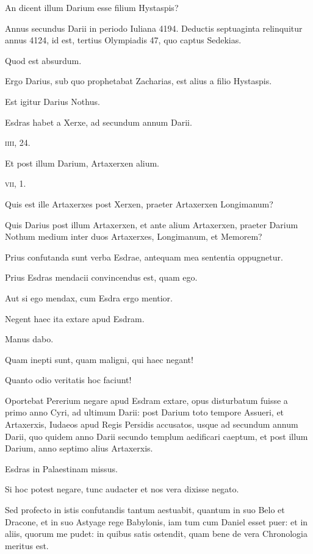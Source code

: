 \begin{parnumbers}
An dicent illum Darium esse filium Hystaspis?

Annus secundus Darii in periodo Iuliana 4194. Deductis septuaginta
relinquitur annus 4124, id est, tertius Olympiadis 47,
quo captus Sedekias.

Quod est absurdum.

Ergo Darius, sub quo
prophetabat Zacharias, est alius a filio Hystaspis.

Est igitur Darius
Nothus.

Esdras habet a Xerxe, ad secundum annum Darii.

\textsc{iiii}, 24.

Et post illum Darium, Artaxerxen alium.

\textsc{vii}, 1.

Quis
est ille Artaxerxes post Xerxen, praeter Artaxerxen Longimanum?

Quis Darius post illum Artaxerxen, et ante alium Artaxerxen, praeter
Darium Nothum medium inter duos Artaxerxes, Longimanum,
et Memorem?

Prius confutanda sunt verba Esdrae, antequam
mea sententia oppugnetur.

Prius Esdras mendacii convincendus
est, quam ego.

Aut si ego mendax, cum Esdra ergo mentior.

Negent haec ita extare apud Esdram.

Manus dabo.

Quam inepti
sunt, quam maligni, qui haec negant!

Quanto odio veritatis hoc faciunt!

Oportebat Pererium negare apud Esdram extare, opus disturbatum
fuisse a primo anno Cyri, ad ultimum Darii: post Darium
toto tempore Assueri, et Artaxerxis, Iudaeos apud Regis Persidis
accusatos, usque ad secundum annum Darii, quo quidem anno
Darii secundo templum aedificari caeptum, et post illum Darium,
anno septimo alius Artaxerxis.

Esdras in Palaestinam missus.

Si hoc potest negare, tunc audacter et nos vera dixisse negato.

Sed profecto
in istis confutandis tantum aestuabit, quantum in suo Belo et
Dracone, et in suo Astyage rege Babylonis, iam tum cum Daniel
esset puer: et in aliis, quorum me pudet: in quibus satis ostendit,
quam bene de vera Chronologia meritus est.


\end{parnumbers}
